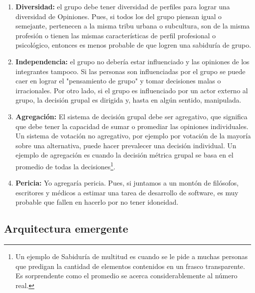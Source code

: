 \begin{enumerate}

\item \textbf{Diversidad:} el grupo debe tener diversidad de perfiles para lograr una diversidad de Opiniones. Pues, si todos los del grupo piensan igual o semejante, pertenecen a la misma tribu urbana o subcultura, son de la misma profesión o tienen las mismas características de perfil profesional o psicológico, entonces es menos probable de que logren una sabiduría de grupo.

\item \textbf{Independencia:} el grupo no debería estar influenciado y las opiniones de los integrantes tampoco. Si las personas son influenciadas por el grupo se puede caer en lograr el "pensamiento de grupo" y tomar decisiones malas o irracionales. Por otro lado, si el grupo es influenciado por un actor externo al grupo, la decisión grupal es dirigida y, hasta en algún sentido, manipulada.

\item \textbf{Agregación:} El sistema de decisión grupal debe ser agregativo, que significa que debe tener la capacidad de sumar o promediar las opiniones individuales. Un sistema de votación no agregativo, por ejemplo por votación de la mayoría sobre una alternativa, puede hacer prevalecer una decisión individual. Un ejemplo de agregación es cuando la decisión métrica grupal se basa en el promedio de todas la decisiones\footnote{Un ejemplo de Sabiduría de multitud es cuando se le pide a muchas personas que predigan la cantidad de elementos contenidos en un frasco transparente. Es sorprendente como el promedio se acerca considerablemente al número real.}.


\item \textbf{Pericia:} Yo agregaría pericia. Pues, si juntamos a un montón de filósofos, escritores y médicos a estimar una tarea de desarrollo de software, es muy probable que fallen en hacerlo por no tener idoneidad.
 

\end{enumerate}

\subsection{Arquitectura emergente}


